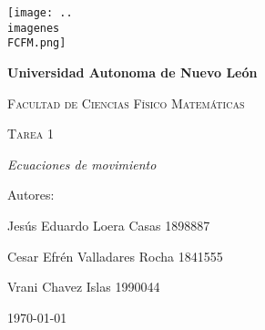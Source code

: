 \begin{titlepage}
    \centering
    {\texttt{[image: ..\\imagenes\\FCFM.png]}\par}
    \vspace{1cm}
    {\bfseries\LARGE Universidad Autonoma de Nuevo León \par}
    \vspace{1cm}
    {\scshape\Large Facultad de Ciencias Físico Matemáticas \par}
    \vspace{3cm}
    {\scshape\Huge Tarea 1  \par}
    \vspace{3cm}
    {\itshape\Large Ecuaciones de movimiento \par}
    \vfill
    {\Large Autores: \par}
    {\Large Jesús Eduardo Loera Casas 1898887 \par}
    \vfill{\Large Cesar Efrén Valladares Rocha 1841555 \par}
    \vfill
    {\Large Vrani Chavez Islas 1990044 \par}
    \vfill
    {\Large \today \par}
\end{titlepage}